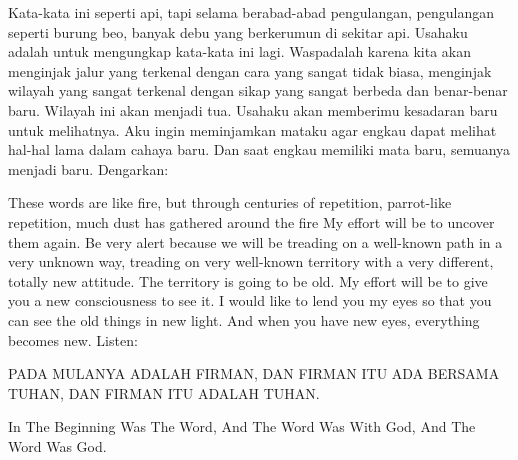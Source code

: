 \bahasa
Kata-kata ini seperti api, tapi selama berabad-abad pengulangan, pengulangan seperti burung beo, banyak debu yang berkerumun di sekitar api. Usahaku adalah untuk mengungkap kata-kata ini lagi. Waspadalah karena kita akan menginjak jalur yang terkenal dengan cara yang sangat tidak biasa, menginjak wilayah yang sangat terkenal dengan sikap yang sangat berbeda dan benar-benar baru. Wilayah ini akan menjadi tua. Usahaku akan memberimu kesadaran baru untuk melihatnya. Aku ingin meminjamkan mataku agar engkau dapat melihat hal-hal lama dalam cahaya baru. Dan saat engkau memiliki mata baru, semuanya menjadi baru. Dengarkan:

\english
These words are like fire, but through centuries of repetition, parrot-like repetition, much dust has gathered around the fire My effort will be to uncover them again. Be very alert because we will be treading on a well-known path in a very unknown way, treading on very well-known territory with a very different, totally new attitude. The territory is going to be old. My effort will be to give you a new consciousness to see it. I would like to lend you my eyes so that you can see the old things in new light. And when you have new eyes, everything becomes new. Listen:

\bahasa
PADA MULANYA ADALAH FIRMAN, DAN FIRMAN ITU ADA BERSAMA TUHAN, DAN FIRMAN ITU ADALAH TUHAN.

\english
In The Beginning Was The Word, And The Word Was With God, And The Word Was God.
